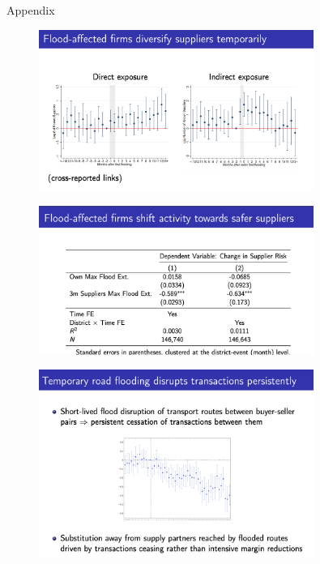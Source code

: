 \documentclass{beamer}
\begin{document}
\begin{frame}[allowframebreaks]{Appendix}
    \label{appendix}
    \begin{figure}
        \centering
        \includegraphics[width=0.8\textwidth]{F1.png}
        \label{fig:appendix1}
        \hyperlink{thoughts}{}  %
    \end{figure}

\begin{figure}
    \centering
    \includegraphics[width=0.8\textwidth]{F2.png}
    \label{fig:appendix2}
\end{figure}

    \hyperlink{thoughts}{}  %
\begin{figure}
    \centering
    \includegraphics[width=0.8\textwidth]{F3.png}
    \label{fig:appendix3}
\end{figure}
\hyperlink{thoughts}{}  %

\end{frame}
\end{document}
